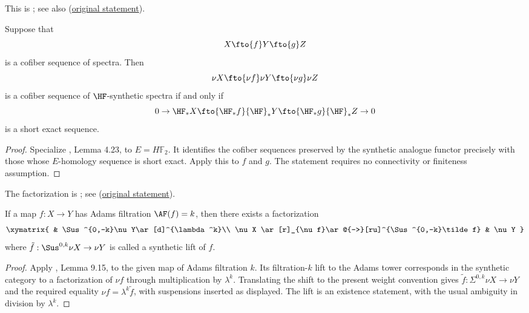\begin{proposition}
\label{paper:3.1}
This is \cite[Lemma 4.23]{Pst}; see also
\cite[Proposition 3.1]{LWX126}
(\href{paper/main.tex.html#L759}{original statement}).\par
\label{prop:1f7950df}
    Suppose that
    $$X\fto{f} Y\fto{g} Z$$
    is a cofiber sequence of spectra. Then
    $$\nu X\fto{\nu f}\nu Y\fto{\nu g} \nu Z$$
    is a cofiber sequence of ${\HF}$-synthetic spectra if and only if
    $$0\to {\HF}_*X\fto{{\HF}_*f} {\HF}_*Y\fto{{\HF}_*g} {\HF}_*Z\to 0$$
    is a short exact sequence.




\end{proposition}
\begin{proof}
Specialize \cite{Pst}, Lemma 4.23, to $E=H\mathbb F_2$. It identifies
the cofiber sequences preserved by the synthetic analogue functor
precisely with those whose $E$-homology sequence is short exact. Apply
this to $f$ and $g$. The statement requires no connectivity or
finiteness assumption.
\end{proof}

\begin{proposition}
\label{paper:3.16}
The factorization is \cite[Lemma 9.15]{BHS}; see
\cite[Proposition 3.16]{LWX126}
(\href{paper/main.tex.html#L912}{original statement}).\par
\label{prop:ef21f9bc}
    If a map $f:X\to Y$ has Adams filtration $\AF(f)=k$, then there exists a factorization
    $$\xymatrix{
     & \Sus^{0,-k}\nu Y\ar[d]^{\lambda^k}\\
     \nu X \ar[r]_{\nu f}\ar@{-->}[ru]^{\Sus^{0,-k}\tilde f} & \nu Y
    }$$
    where $\tilde f: \Sus^{0,k}\nu X\to \nu Y$ is called a synthetic lift of $f$.




\end{proposition}
\begin{proof}
Apply \cite{BHS}, Lemma 9.15, to the given map of Adams filtration $k$. Its filtration-$k$ lift to the Adams tower corresponds in the synthetic category to a factorization of $\nu f$ through multiplication by $\lambda^k$. Translating the shift to the present weight convention gives $\widetilde f:\Sigma^{0,k}\nu X\to\nu Y$ and the required equality $\nu f=\lambda^k\widetilde f$, with suspensions inserted as displayed. The lift is an existence statement, with the usual ambiguity in
division by $\lambda^k$.
\end{proof}

